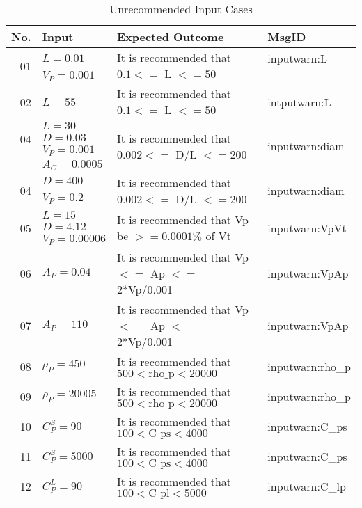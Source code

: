 \documentclass[12pt]{article}
\begin{document}
\begin{center}
	\begin{longtable}{ | r | p{3cm} | p{5cm} | p{4cm} |}
	\caption{Unrecommended Input Cases} \\ \hline \label{TblUnrecommendedInput} 
	No. & Input & Expected Outcome & MsgID \\ \hline
	\multirow{2}{*}{01} & $L = 0.01$ & \multirow{2}{*}{\parbox{5cm}{It is recommended that $0.1 <=$ L $<= 50$}}& inputwarn:L\\ 
	& $V_P = 0.001$ & & \\ \hline
	02 & $L = 55$ & It is recommended that $0.1 <=$ L $<= 50$ & intputwarn:L\\ \hline
    \multirow{3}{*}{04} & $L = 30$ & \multirow{4}{*}{\parbox{5cm}{It is recommended that $0.002 <=$ D/L $<= 200$}} & \multirow{4}{*}{inputwarn:diam} \\
    & $D = 0.03$ & & \\
    & $V_P = 0.001$ & & \\
    & $A_C = 0.0005$ & & \\ \hline
	\multirow{2}{*}{04} & $D = 400$ & \multirow{2}{*}{\parbox{5cm}{It is recommended that $0.002 <=$ D/L $<= 200$}} & \multirow{2}{*}{inputwarn:diam}\\
	& $V_P = 0.2$ & & \\ \hline
	\multirow{3}{*}{05} & $L = 15$ & \multirow{3}{*}{\parbox{5cm}{It is recommended that Vp be $>= 0.0001\%$ of Vt}} & \multirow{3}{*}{inputwarn:VpVt}\\ 
	& $D = 4.12$ & & \\
	& $V_P = 0.00006$ & & \\ \hline
	06 & $A_P = 0.04$ & It is recommended that Vp $<=$ Ap $<=$ 2*Vp/0.001 & inputwarn:VpAp \\ \hline
	07 & $A_P = 110$ & It is recommended that Vp $<=$ Ap $<=$ 2*Vp/0.001 & inputwarn:VpAp \\ \hline
	08 & $\rho_P = 450$ & It is recommended that $500 < \text{rho\_{p}} < 20000$ &inputwarn:rho\_{p} \\ \hline
	09 & $\rho_P = 20005$ & It is recommended that $500 < \text{rho\_{p}} < 20000$ & inputwarn:rho\_{p}\\ \hline
	10 & $C^S_P = 90$ & It is recommended that $100 < \text{C\_{ps}} < 4000$ & inputwarn:C\_{ps}\\ \hline
	11 & $C^S_P = 5000$ & It is recommended that $100 < \text{C\_{ps}} < 4000$ & inputwarn:C\_{ps}\\ \hline
	12 & $C^L_P = 90$ & It is recommended that $100 < \text{C\_{pl}} < 5000$ & inputwarn:C\_{lp} \\ \hline

\end{longtable}
\end{center}
\end{document}

